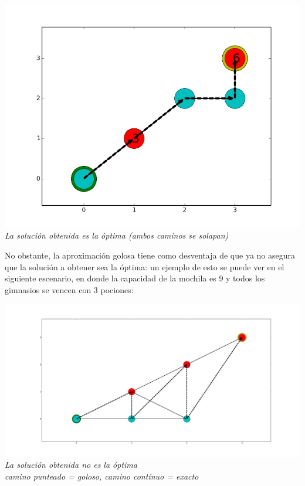 \vspace*{0.3cm} \vspace*{0.3cm}
  \begin{center}
\includegraphics[scale=0.40]{./EJ2/optima.jpeg}
\\{\textit{La soluci\'on obtenida es la \'optima (ambos caminos se solapan)}}
  \end{center}
  \vspace*{0.3cm}

No obstante, la aproximación golosa tiene como desventaja de que ya no asegura que la solución a obtener sea la óptima: un ejemplo de esto se puede ver en el siguiente escenario, en donde la capacidad de la mochila es 9 y todos los gimnasios se vencen con 3 pociones:

\vspace*{0.3cm} \vspace*{0.3cm}
  \begin{center}
\includegraphics[scale=0.20]{./EJ2/nooptima.jpeg}
\\{\textit{La soluci\'on obtenida no es la \'optima\\ camino punteado = goloso, camino contínuo = exacto}}
  \end{center}
  \vspace*{0.3cm}
  
